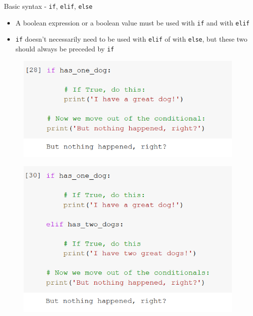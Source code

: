 \documentclass[aspectratio=169]{beamer}
\begin{document}
\begin{frame}{Basic syntax - \texttt{if}, \texttt{elif}, \texttt{else}}

	\begin{itemize}
		\item A boolean expression or a boolean value must be used with \texttt{if} and with \texttt{elif}
		\item \texttt{if} doesn't necessarily need to be used with \texttt{elif} of with \texttt{else}, but these two should always be preceded by \texttt{if}
	\end{itemize}

	\begin{multicols}{3}

		\begin{figure}
			\centering
			\includegraphics[width=\linewidth]{img/if_alone.png}
		\end{figure}
		\begin{figure}
			\centering
			\includegraphics[width=\linewidth]{img/if_elif.png}
		\end{figure}
		\begin{figure}

\end{figure}
\end{multicols}
\end{frame}
\end{document}
